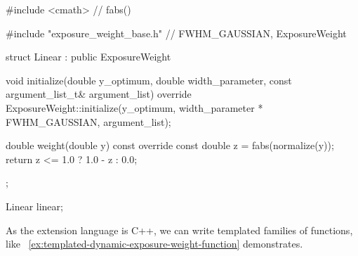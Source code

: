\begin{exemplar}[htbp]
  \begin{maxipage}
    \begin{cxxlisting}
#include <cmath>                     // fabs()

#include "exposure_weight_base.h"    // FWHM_GAUSSIAN, ExposureWeight

struct Linear : public ExposureWeight {
    void initialize(double y_optimum, double width_parameter,
                    const argument_list_t& argument_list) override {
        ExposureWeight::initialize(y_optimum,
                                   width_parameter * FWHM_GAUSSIAN,
                                   argument_list);
    }

    double weight(double y) const override {
        const double z = fabs(normalize(y));
        return z <= 1.0 ? 1.0 - z : 0.0;
    }
};

Linear linear;
    \end{cxxlisting}
  \end{maxipage}

  \caption[Simple dynamic exposure weight function]{%
    \label{ex:simple-dynamic-exposure-weight-function}%
    A dynamic exposure weight function that defines a ``roof-top''.  The natural width is
    exactly one, so we override method~ to rescale , passed in
    as , by multiplying with  to get the same width
    as the Gaussian.}
\end{exemplar}


As the extension language is C++, we can write templated families of functions, like
\exampleName~\ref{ex:templated-dynamic-exposure-weight-function} demonstrates.


